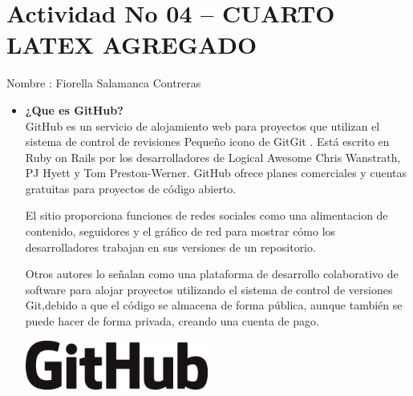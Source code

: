 \section{Actividad No 04 – CUARTO LATEX AGREGADO} 
		
Nombre : Fiorella Salamanca Contreras\\

\begin{itemize} %
\item \textbf{¿Que es GitHub?}\\

GitHub es un servicio de alojamiento web para proyectos que utilizan el sistema de control de revisiones Pequeño icono de GitGit . Está escrito en Ruby on Rails por los desarrolladores de Logical Awesome Chris Wanstrath, PJ Hyett y Tom Preston-Werner. GitHub ofrece planes comerciales y cuentas gratuitas para proyectos de código abierto.

El sitio proporciona funciones de redes sociales como una alimentacion de contenido, seguidores y el gráfico de red para mostrar cómo los desarrolladores trabajan en sus versiones de un repositorio.

Otros autores lo señalan como una plataforma de desarrollo colaborativo de software para alojar proyectos utilizando el sistema de control de versiones Git,debido a que el código se almacena de forma pública, aunque también se puede hacer de forma privada, creando una cuenta de pago.\\

\begin{center}
\includegraphics[width=6cm]{./Imagenes/actividad0401} 
\end{center}
	
\end{itemize} 


